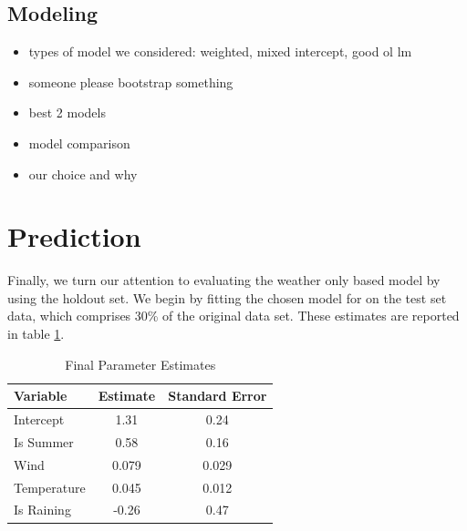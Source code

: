 \documentclass{article}
\begin{document}
\subsection{Modeling}

\begin{itemize}

\item types of model we considered: weighted, mixed intercept, good ol lm
\item someone please bootstrap something
\item best 2 models
\item model comparison
\item our choice and why

\end{itemize}

\section{Prediction}\label{Prediction}


Finally, we turn our attention to  evaluating the weather only based model by using the holdout set.  We begin by fitting the chosen model for on the test set data, which comprises 30\% of the original data set. These estimates are reported in table \ref{Parameter Estimates}.  

\begin{table}
\centering
\begin{tabular}{ | l | c | c |}\hline
  Variable & Estimate & Standard Error \\ \hline
  Intercept & 1.31 & 0.24 \\
  Is Summer & 0.58 & 0.16 \\
  Wind & 0.079 & 0.029 \\
  Temperature & 0.045 & 0.012 \\
  Is Raining & -0.26 &   0.47 \\
  \hline
\end{tabular}
\caption{Final Parameter Estimates}
\label{Parameter Estimates}
\end{table}
\end{document}
